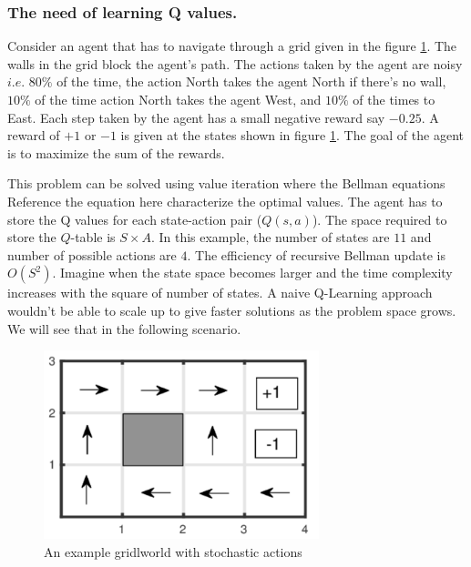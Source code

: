 \documentclass[12pt]{report}
\newcommand{\ie}{\textit{i.e.}}
\begin{document}
\subsubsection{The need of learning Q values.}
Consider an agent that has to navigate through a grid given in the figure \ref{fig:gridworld_ex}. The walls in the grid block the agent's path. The actions taken by the agent are noisy $\ie$  $80\%$ of the time, the action North takes the agent North if there's no wall, $10\%$ of the time action North takes the agent West, and $10\%$ of the times to East. Each step taken by the agent has a small negative reward say $-0.25$. A reward of $+1$ or $-1$ is given at the states shown in figure \ref{fig:gridworld_ex}. The goal of the agent is to maximize the sum of the rewards. \par 
This problem can be solved using value iteration where the Bellman equations {\color{red} Reference the equation here} characterize the optimal values. The agent has to store the Q values for each state-action pair ($Q(s,a)$). The space required to store the $Q$-table is $S \times A$. In this example, the number of states are $11$ and number of possible actions are $4$. The efficiency of recursive Bellman update is $O(S^2)$. Imagine when the state space becomes larger and the time complexity increases with the square of number of states. A naive Q-Learning approach wouldn't be able to scale up to give faster solutions as the problem space grows. We will see that in the following scenario.

\begin{figure}[htp]
	\centering
	\includegraphics[width=8cm]{gridworld.pdf}
	\caption{An example gridlworld with stochastic actions}
   \label{fig:gridworld_ex}
\end{figure}
\end{document}
